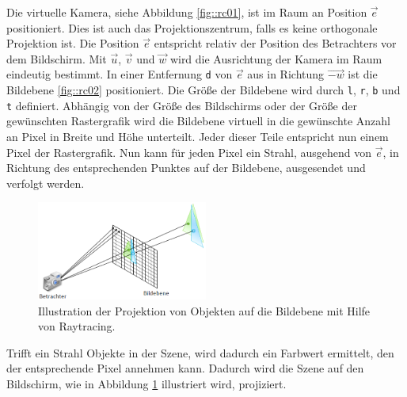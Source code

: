 Die virtuelle Kamera, siehe Abbildung \ref{fig::rc01}, ist im Raum an Position $\vec{e}$ positioniert.
Dies ist auch das Projektionszentrum, falls es keine orthogonale Projektion ist.
Die Position $\vec{e}$ entspricht relativ der Position des Betrachters vor dem Bildschirm.
Mit $\vec{u}$, $\vec{v}$ und $\vec{w}$ wird die Ausrichtung der Kamera im Raum eindeutig bestimmt.
In einer Entfernung \texttt{d} von $\vec{e}$ aus in Richtung $\vec{-w}$ ist die Bildebene \ref{fig::rc02} positioniert.
Die Größe der Bildebene wird durch \texttt{l}, \texttt{r}, \texttt{b} und \texttt{t} definiert.
Abhängig von der Größe des Bildschirms oder der Größe der gewünschten Rastergrafik wird die Bildebene virtuell in die gewünschte Anzahl an Pixel in Breite und Höhe unterteilt.
Jeder dieser Teile entspricht nun einem Pixel der Rastergrafik.
Nun kann für jeden Pixel ein Strahl, ausgehend von $\vec{e}$, in Richtung des entsprechenden Punktes auf der Bildebene, ausgesendet und verfolgt werden.
\begin{figure}
	\centering
	\includegraphics[width=0.5\textwidth]{../../Grafiken/Raytracing.png}
	\caption{Illustration der Projektion von Objekten auf die Bildebene mit Hilfe von Raytracing. \cite{Dr.MichaelKrone2016/2017}}
	\label{fig::rc03}
\end{figure}
Trifft ein Strahl Objekte in der Szene, wird dadurch ein Farbwert ermittelt, den der entsprechende Pixel annehmen kann.
Dadurch wird die Szene auf den Bildschirm, wie in Abbildung \ref{fig::rc03} illustriert wird, projiziert.

